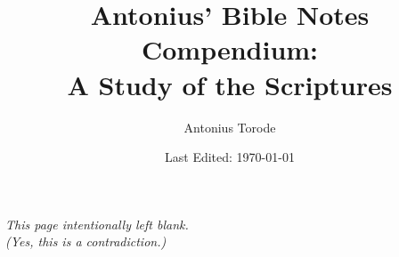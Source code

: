 \documentclass[openany,twoside, letterpaper,11pt]{book}
\title{Antonius' Bible Notes Compendium: \\ A Study of the Scriptures}
\author{Antonius Torode}
\date{Last Edited: \today}  %
\begin{document}
	
\maketitle
\thispagestyle{empty}
\pagestyle{empty}




\tableofcontents

\thispagestyle{empty}
\newpage
{}
\begin{center}
	\textit{This page intentionally left blank.\\ (Yes, this is a contradiction.)}
\end{center}
	
\newpage  %



	
	


\backmatter

\printindex
\end{document}
